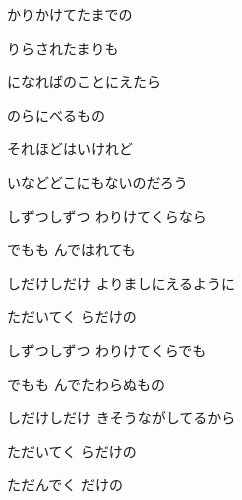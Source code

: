 \documentclass[14pt]{ltjsarticle}
\begin{document}
{\item
  かりかけてたまでの
  \jisho{}

  りらされたまりも
  \jisho{}

  になればのことにえたら
  \jisho{}

  のらにべるもの
  \jisho{}

  それほどはいけれど
  \jisho{}

  いなどどこにもないのだろう
  \jisho{}

\item
  しずつしずつ わりけてくらなら
  \jisho{}

  でもも んではれても
  \jisho{}

  しだけしだけ よりましにえるように
  \jisho{}

  ただいてく らだけの
  \jisho{}

\item
  しずつしずつ わりけてくらでも
  \jisho{}

  でもも んでたわらぬもの
  \jisho{}

  しだけしだけ きそうながしてるから
  \jisho{}

  ただいてく らだけの
  \jisho{}

\item
  ただんでく だけの
  \jisho{}

  
}
\end{document}
